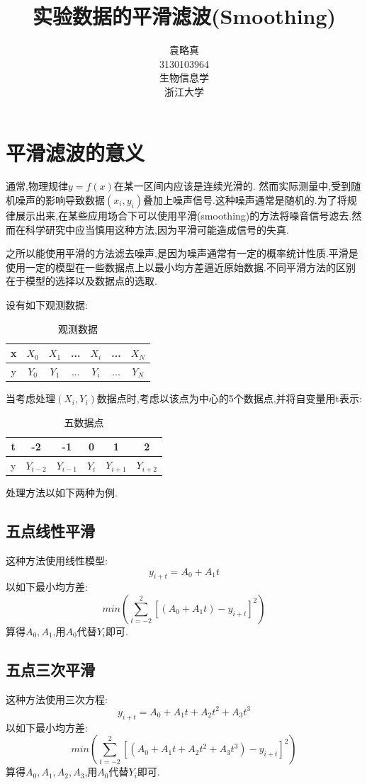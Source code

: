 \documentclass[10pt,a4paper]{article}
\title{实验数据的平滑滤波(Smoothing)}
\author{袁略真\\3130103964\\生物信息学\\浙江大学}
\begin{document}
\maketitle

\section{平滑滤波的意义}
通常,物理规律$y=f(x)$在某一区间内应该是连续光滑的. 然而实际测量中,受到随机噪声的影响导致数据$(x_i,y_i)$叠加上噪声信号.这种噪声通常是随机的.为了将规律展示出来,在某些应用场合下可以使用平滑(smoothing)的方法将噪音信号滤去.然而在科学研究中应当慎用这种方法,因为平滑可能造成信号的失真.

之所以能使用平滑的方法滤去噪声,是因为噪声通常有一定的概率统计性质.平滑是使用一定的模型在一些数据点上以最小均方差逼近原始数据.不同平滑方法的区别在于模型的选择以及数据点的选取.

设有如下观测数据:
\begin{table}[H]
\caption{观测数据}
\centering
\begin{tabular}{|c|c|c|c|c|c|c|}
\hline 
x & $X_0$ & $X_1$ & ... & $X_i$ & ... & $X_N$ \\ 
\hline 
y & $Y_0$ & $Y_1$ & ... & $Y_i$ & ... & $Y_N$ \\ 
\hline 
\end{tabular} 
\end{table}
当考虑处理$(X_i,Y_i)$数据点时,考虑以该点为中心的5个数据点,并将自变量用t表示:
\begin{table}[H]
\caption{五数据点}
\centering
\begin{tabular}{|c|c|c|c|c|c|}
\hline 
t & -2 & -1 & 0 & 1 & 2 \\ 
\hline 
y & $Y_{i-2}$ & $Y_{i-1}$ & $Y_i$ & $Y_{i+1}$ & $Y_{i+2}$ \\ 
\hline 
\end{tabular} 
\end{table}

处理方法以如下两种为例.
\subsection{五点线性平滑}
这种方法使用线性模型:
$$y_{i+t}=A_0+A_1t$$
以如下最小均方差:
$$min(\sum\limits_{t=-2}^{2} [(A_0+A_1t)-y_{i+t}]^2)$$
算得$A_0,A_1$,用$A_0$代替$Y_i$即可.

\subsection{五点三次平滑}
这种方法使用三次方程:
$$y_{i+t}=A_0+A_1t+A_2t^2+A_3t^3$$
以如下最小均方差:
$$min(\sum\limits_{t=-2}^{2} [(A_0+A_1t+A_2t^2+A_3t^3)-y_{i+t}]^2)$$
算得$A_0,A_1,A_2,A_3$,用$A_0$代替$Y_i$即可.
\end{document}
